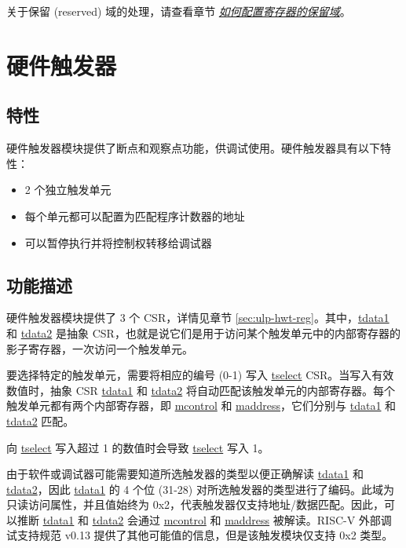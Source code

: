 \documentclass[main\_\_CN.tex]{subfiles}
\begin{document}
关于保留 (reserved) 域的处理，请查看章节 \hyperref[programming-reserved-field]{\textit{如何配置寄存器的保留域}}。




\section{硬件触发器}\label{sec:ulp-trigger}

\subsection{特性}
硬件触发器模块提供了断点和观察点功能，供调试使用。硬件触发器具有以下特性：

\begin{itemize}
    \item 2 个独立触发单元
    \item 每个单元都可以配置为匹配程序计数器的地址
    \item 可以暂停执行并将控制权转移给调试器

\end{itemize}

\subsection{功能描述}
\label{sec:ulp-hwt-func-descr}

硬件触发器模块提供了 3 个 CSR，详情见章节 \ref{sec:ulp-hwt-reg}。其中，\hyperref[regdesc:LPTDATA1]{tdata1} 和 \hyperref[regdesc:LPTDATA2]{tdata2} 是抽象 CSR，也就是说它们是用于访问某个触发单元中的内部寄存器的影子寄存器，一次访问一个触发单元。

要选择特定的触发单元，需要将相应的编号 (0-1) 写入 \hyperref[regdesc:LPTSELECT]{tselect} CSR。当写入有效数值时，抽象 CSR \hyperref[regdesc:LPTDATA1]{tdata1} 和 \hyperref[regdesc:LPTDATA2]{tdata2} 将自动匹配该触发单元的内部寄存器。每个触发单元都有两个内部寄存器，即 \hyperref[regdesc:LPMCONTROL]{mcontrol} 和 \hyperref[regdesc:LPMADDRESS]{maddress}，它们分别与 \hyperref[regdesc:LPTDATA1]{tdata1} 和 \hyperref[regdesc:LPTDATA2]{tdata2} 匹配。

向 \hyperref[regdesc:LPTSELECT]{tselect} 写入超过 1 的数值时会导致 \hyperref[regdesc:LPTSELECT]{tselect} 写入 1。

由于软件或调试器可能需要知道所选触发器的类型以便正确解读 \hyperref[regdesc:LPTDATA1]{tdata1} 和 \hyperref[regdesc:LPTDATA2]{tdata2}，因此 \hyperref[regdesc:LPTDATA1]{tdata1} 的 4 个位 (31-28) 对所选触发器的类型进行了编码。此域为只读访问属性，并且值始终为 0x2，代表触发器仅支持地址/数据匹配。因此，可以推断 \hyperref[regdesc:LPTDATA1]{tdata1} 和 \hyperref[regdesc:LPTDATA2]{tdata2} 会通过 \hyperref[regdesc:LPMCONTROL]{mcontrol} 和 \hyperref[regdesc:LPMADDRESS]{maddress} 被解读。RISC-V 外部调试支持规范 v0.13 提供了其他可能值的信息，但是该触发模块仅支持 0x2 类型。
\end{document}
